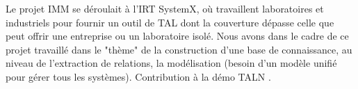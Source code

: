 \documentclass[PhD-Yoann-Dupont.tex]{subfiles}
\begin{document}
Le projet IMM se déroulait à l'IRT SystemX, où travaillent laboratoires et industriels pour fournir un outil de TAL dont la couverture dépasse celle que peut offrir une entreprise ou un laboratoire isolé. Nous avons dans le cadre de ce projet travaillé dans le "thème" de la construction d'une base de connaissance, au niveau de l'extraction de relations, la modélisation (besoin d'un modèle unifié pour gérer tous les systèmes). Contribution à la démo TALN \citep{mesnard2016}.
\end{document}
